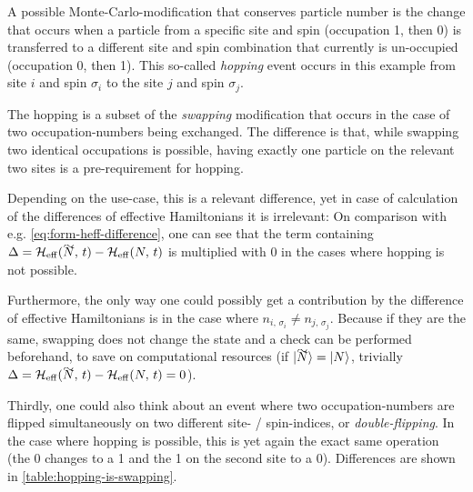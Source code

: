 A possible Monte-Carlo-modification that conserves particle number is the change that occurs when a particle from a specific site and spin (occupation 1, then 0) is transferred to a different site and spin combination that currently is un-occupied (occupation 0, then 1).
This so-called \emph{hopping} event occurs in this example from site $i$ and spin $\sigma_i$ to the site $j$ and spin $\sigma_j$. 

The hopping is a subset of the \emph{swapping} modification that occurs in the case of two occupation-numbers being exchanged.
The difference is that, while swapping two identical occupations is possible, having exactly one particle on the relevant two sites is a pre-requirement for hopping.

Depending on the use-case, this is a relevant difference, yet in case of calculation of the differences of effective Hamiltonians it is irrelevant: 
On comparison with e.g. \autoref{eq:form-heff-difference}, one can see that the term containing $\Delta = \HeffOft[\vphantom{N}\smash{\tilde{N}}]-\HeffOft[N]$ is multiplied with 0 in the cases where hopping is not possible.

Furthermore, the only way one could possibly get a contribution by the difference of effective Hamiltonians is in the case where $n_{i,\,\sigma_i} \neq n_{j,\,\sigma_j}$.
Because if they are the same, swapping does not change the state and a check can be performed beforehand, to save on computational resources (if $\ketN[\vphantom{N}\smash{\tilde{N}}] = \ketN[N]$, trivially  $\Delta = \HeffOft[\vphantom{N}\smash{\tilde{N}}]-\HeffOft[N] = 0$).

Thirdly, one could also think about an event where two occupation-numbers are flipped simultaneously on two different site- / spin-indices, or \emph{double-flipping}.
In the case where hopping is possible, this is yet again the exact same operation (the 0 changes to a 1 and the 1 on the second site to a 0).
Differences are shown in \autoref{table:hopping-is-swapping}.

